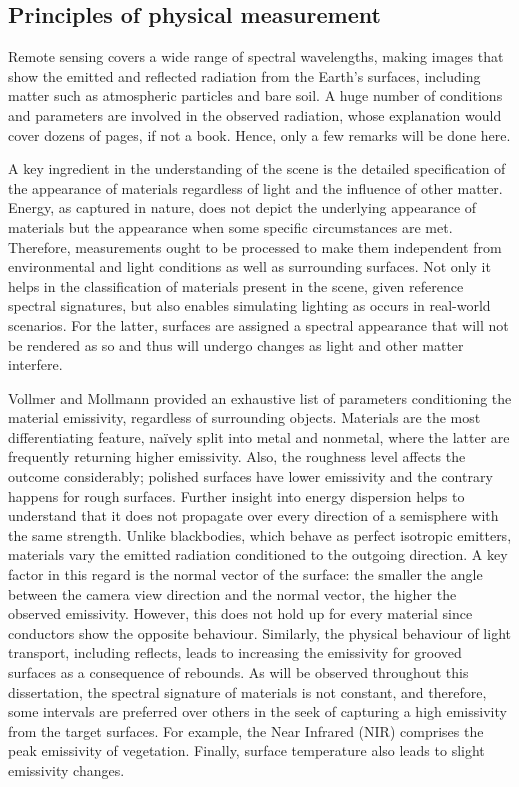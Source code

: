 \subsection{Principles of physical measurement}

\gls{Remote sensing} covers a wide range of spectral wavelengths, making images that show the emitted and reflected radiation from the Earth's surfaces, including matter such as atmospheric particles and bare soil. A huge number of conditions and parameters are involved in the observed radiation, whose explanation would cover dozens of pages, if not a book. Hence, only a few remarks will be done here. 

A key ingredient in the understanding of the scene is the detailed specification of the appearance of materials regardless of light and the influence of other matter. Energy, as captured in nature, does not depict the underlying appearance of materials but the appearance when some specific circumstances are met. Therefore, measurements ought to be processed to make them independent from environmental and light conditions as well as surrounding surfaces. Not only it helps in the classification of materials present in the scene, given reference spectral signatures, but also enables simulating lighting as occurs in real-world scenarios. For the latter, surfaces are assigned a spectral appearance that will not be rendered as so and thus will undergo changes as light and other matter interfere. 

Vollmer and Mollmann \cite{vollmer_infrared_2017} provided an exhaustive list of parameters conditioning the material emissivity, regardless of surrounding objects. Materials are the most differentiating feature, naïvely split into metal and nonmetal, where the latter are frequently returning higher emissivity. Also, the roughness level affects the outcome considerably; polished surfaces have lower emissivity and the contrary happens for rough surfaces. Further insight into energy dispersion helps to understand that it does not propagate over every direction of a semisphere with the same strength. Unlike blackbodies, which behave as perfect isotropic emitters, materials vary the emitted radiation conditioned to the outgoing direction. A key factor in this regard is the normal vector of the surface: the smaller the angle between the camera view direction and the normal vector, the higher the observed emissivity. However, this does not hold up for every material since conductors show the opposite behaviour. Similarly, the physical behaviour of light transport, including reflects, leads to increasing the emissivity for grooved surfaces as a consequence of rebounds. As will be observed throughout this dissertation, the spectral signature of materials is not constant, and therefore, some intervals are preferred over others in the seek of capturing a high emissivity from the target surfaces. For example, the Near Infrared (NIR) comprises the peak emissivity of vegetation. Finally, surface temperature also leads to slight emissivity changes.

